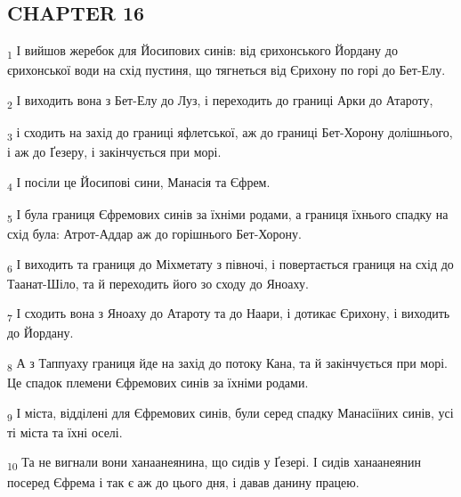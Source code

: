 \subsection{CHAPTER 16}
\begin{tcolorbox}
\textsubscript{1} І вийшов жеребок для Йосипових синів: від єрихонського Йордану до єрихонської води на схід пустиня, що тягнеться від Єрихону по горі до Бет-Елу.
\end{tcolorbox}
\begin{tcolorbox}
\textsubscript{2} І виходить вона з Бет-Елу до Луз, і переходить до границі Арки до Атароту,
\end{tcolorbox}
\begin{tcolorbox}
\textsubscript{3} і сходить на захід до границі яфлетської, аж до границі Бет-Хорону долішнього, і аж до Ґезеру, і закінчується при морі.
\end{tcolorbox}
\begin{tcolorbox}
\textsubscript{4} І посіли це Йосипові сини, Манасія та Єфрем.
\end{tcolorbox}
\begin{tcolorbox}
\textsubscript{5} І була границя Єфремових синів за їхніми родами, а границя їхнього спадку на схід була: Атрот-Аддар аж до горішнього Бет-Хорону.
\end{tcolorbox}
\begin{tcolorbox}
\textsubscript{6} І виходить та границя до Міхметату з півночі, і повертається границя на схід до Таанат-Шіло, та й переходить його зо сходу до Яноаху.
\end{tcolorbox}
\begin{tcolorbox}
\textsubscript{7} І сходить вона з Яноаху до Атароту та до Наари, і дотикає Єрихону, і виходить до Йордану.
\end{tcolorbox}
\begin{tcolorbox}
\textsubscript{8} А з Таппуаху границя йде на захід до потоку Кана, та й закінчується при морі. Це спадок племени Єфремових синів за їхніми родами.
\end{tcolorbox}
\begin{tcolorbox}
\textsubscript{9} І міста, відділені для Єфремових синів, були серед спадку Манасіїних синів, усі ті міста та їхні оселі.
\end{tcolorbox}
\begin{tcolorbox}
\textsubscript{10} Та не вигнали вони ханаанеянина, що сидів у Ґезері. І сидів ханаанеянин посеред Єфрема і так є аж до цього дня, і давав данину працею.
\end{tcolorbox}
